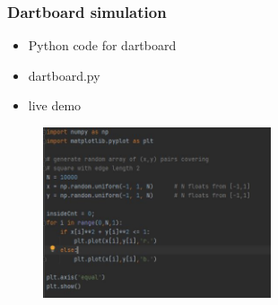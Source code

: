 \documentclass[english,14pt]{beamer}
\begin{document}

\begin{frame}[fragile]

\frametitle{Dartboard simulation}

\begin{itemize}
	\item Python code for dartboard
	\item dartboard.py
	\item live demo
\end{itemize}

\begin{figure}[ht]
	\centering
	\includegraphics[width=0.6\textwidth]{figures/dartboard}
\end{figure}

\end{frame}

\end{document}
